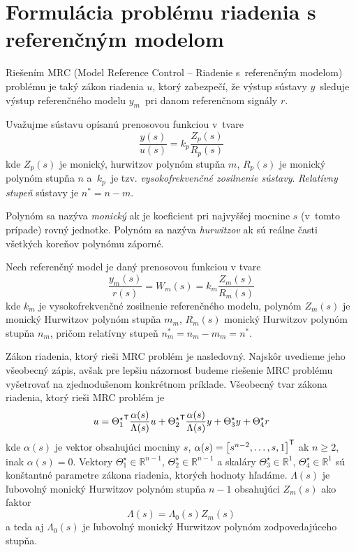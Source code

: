 \documentclass[a4paper, 10pt, ]{article}
\begin{document}
\section{Formulácia problému riadenia s referenčným modelom}
\label{MRC problém}



Riešením MRC (Model Reference Control -- Riadenie s~referenčným modelom) problému je taký zákon riadenia $u$, ktorý zabezpečí, že výstup sústavy $y$~sleduje výstup referenčného modelu $y_m$~pri danom referenčnom signály $r$.



Uvažujme sústavu opísanú prenosovou funkciou v~tvare
\begin{equation} \label{PFsustavy_MRCp}
	\frac{y(s)}{u(s)} = k_p \frac{Z_p(s)}{R_p(s)}
\end{equation}
kde $Z_p(s)$ je monický, hurwitzov polynóm stupňa $m$, $R_p(s)$ je monický polynóm stupňa $n$ a~$k_p$~je tzv. \emph{vysokofrekvenčné zosilnenie sústavy}. \emph{Relatívny stupeň} sústavy je $n^* = n - m$.

Polynóm sa nazýva \emph{monický} ak je koeficient pri najvyššej mocnine $s$ (v~tomto prípade) rovný jednotke. Polynóm sa nazýva \emph{hurwitzov} ak sú reálne časti všetkých koreňov polynómu záporné.

Nech referenčný model je daný prenosovou funkciou v tvare
\begin{equation} \label{RefModelMRCp}
	\frac{y_m(s)}{r(s)} = W_m(s) = k_m \frac{Z_m(s)}{R_m(s)}
\end{equation}
kde $k_m$ je vysokofrekvenčné zosilnenie referenčného modelu, polynóm $Z_m(s)$ je monický Hurwitzov polynóm stupňa $m_m$, $R_m(s)$ monický Hurwitzov polynóm stupňa $n_m$, pričom relatívny stupeň $n^*_m = n_m - m_m = n^*$.

Zákon riadenia, ktorý rieši MRC problém je nasledovný. Najskôr uvedieme jeho všeobecný zápis, avšak pre lepšiu názornosť budeme riešenie MRC problému vyšetrovať na zjednodušenom konkrétnom príklade. Všeobecný tvar zákona riadenia, ktorý rieši MRC problém je
\begin{equation} \label{generalControlLaw}
    u = {\Theta_1^\star}^{\mathsf{T}} \frac{\alpha(s)}{\Lambda(s)} u + {\Theta_2^\star}^{\mathsf{T}} \frac{\alpha(s)}{\Lambda(s)} y + \Theta_3^\star y + \Theta_4^\star r
\end{equation}
kde $\alpha(s)$ je vektor obsahujúci mocniny $s$, $\alpha(s) = \begin{bmatrix} s^{n-2}, \ldots,s, 1 \end{bmatrix}^{\mathsf{T}}$ ak $n\geq 2$, inak $\alpha(s) = 0$. Vektory $\Theta_1^\star \in \mathbb{R}^{n-1}$, $\Theta_2^\star \in \mathbb{R}^{n-1}$ a skaláry $\Theta_3^\star \in \mathbb{R}^1$, $\Theta_4^\star \in \mathbb{R}^1$ sú konštantné parametre zákona riadenia, ktorých hodnoty hľadáme.  $\Lambda(s)$ je ľubovolný monický Hurwitzov polynóm stupňa $n-1$ obsahujúci $Z_m(s)$ ako faktor
\begin{equation}
	\Lambda(s) = \Lambda_0(s) Z_m(s)
\end{equation}
a teda aj $\Lambda_0(s)$ je ľubovolný monický Hurwitzov polynóm zodpovedajúceho stupňa.
\end{document}
